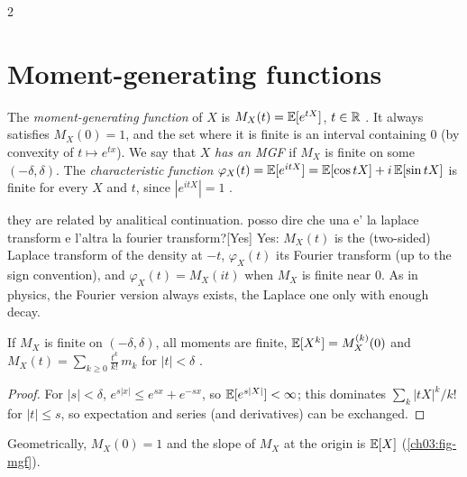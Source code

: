 \begin{paracol}{2}
\section{Moment-generating functions}\label{ch03:sec-mgf}

\begin{definition}
The \emph{moment-generating function} of $X$ is $M_X(t)=\mathbb{E}[e^{tX}]$, $t\in\mathbb{R}$ .
It always satisfies $M_X(0)=1$, and the set where it is finite is an interval containing $0$ (by
convexity of $t\mapsto e^{tx}$). We say that $X$ \emph{has an MGF} if $M_X$ is finite on some
$(-\delta,\delta)$. The \emph{characteristic function} $\varphi_X(t)=\mathbb{E}[e^{itX}]=\mathbb{E}[\cos tX]+i\,\mathbb{E}[\sin tX]$
is finite for every $X$ and $t$, since $|e^{itX}|=1$ .
\end{definition}\begin{answer}{they are related by analitical continuation. posso dire che una e' la laplace transform e l'altra la fourier transform?}[Yes]
Yes: $M_X(t)$ is the (two-sided) Laplace transform of the density at $-t$, $\varphi_X(t)$ its Fourier
transform (up to the sign convention), and $\varphi_X(t)=M_X(it)$ when $M_X$ is finite near 0. As in
physics, the Fourier version always exists, the Laplace one only with enough decay.
\end{answer}

\begin{proposition}
If $M_X$ is finite on $(-\delta,\delta)$, all moments are finite, $\mathbb{E}[X^k]=M_X^{(k)}(0)$ and
$M_X(t)=\sum_{k\ge0}\frac{t^k}{k!}\,m_k$ for $|t|<\delta$ .
\end{proposition}
\begin{proof}
For $|s|<\delta$, $e^{s|x|}\le e^{sx}+e^{-sx}$, so $\mathbb{E}[e^{s|X|}]<\infty$; this dominates $\sum_k|tX|^k/k!$ for
$|t|\le s$, so expectation and series (and derivatives) can be exchanged.
\end{proof}
Geometrically, $M_X(0)=1$ and the slope of $M_X$ at the origin is $\mathbb{E}[X]$ (\cref{ch03:fig-mgf}).


\end{paracol}
